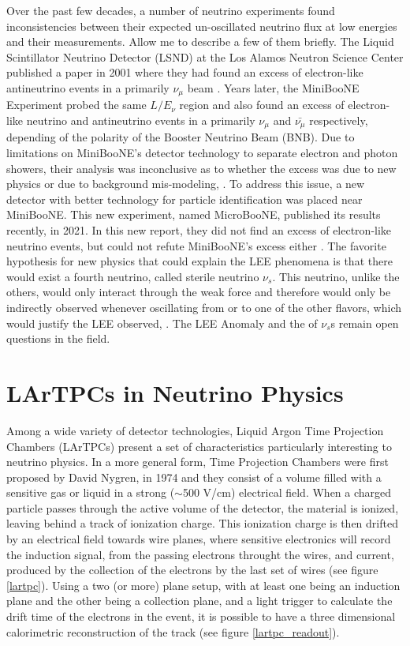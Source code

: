 Over the past few decades, a number of neutrino experiments found inconsistencies between their expected un-oscillated neutrino flux at low energies and their measurements. Allow me to describe a few of them briefly. The Liquid Scintillator Neutrino Detector (LSND) at the Los Alamos Neutron Science Center published a paper in 2001 where they had found an excess of electron-like antineutrino events in a primarily $\nu_{\mu}$ beam \cite{lsnd}. Years later, the MiniBooNE Experiment probed the same $L/E_{\nu}$ region and also found an excess of electron-like neutrino and antineutrino events in a primarily $\nu_{\mu}$ and $\bar{\nu_{\mu}}$ respectively, depending of the polarity of the Booster Neutrino Beam (BNB). Due to limitations on MiniBooNE's detector technology to separate electron and photon showers, their analysis was inconclusive as to whether the excess was due to new physics or due to background mis-modeling, \cite{miniboone}. To address this issue, a new detector with better technology for particle identification was placed near MiniBooNE. This new experiment, named MicroBooNE, published its results recently, in 2021. In this new report, they did not find an excess of electron-like neutrino events, but could not refute MiniBooNE's excess either \cite{microboone_lee}. The favorite hypothesis for new physics that could explain the LEE phenomena is that there would exist a fourth neutrino, called sterile neutrino $\nu_s$. This neutrino, unlike the others, would only interact through the weak force and therefore would only be indirectly observed whenever oscillating from or to one of the other flavors, which would justify the LEE observed, \cite{Lauren_thesis}. 
The LEE Anomaly and the of $\nu_s$s remain open questions in the field. 

\section{LArTPCs in Neutrino Physics}

Among a wide variety of detector technologies, Liquid Argon Time Projection Chambers (LArTPCs) present a set of characteristics particularly interesting to neutrino physics. 
In a more general form, Time Projection Chambers were first proposed by David Nygren, in 1974 \cite{Nygren} and they consist of a volume filled with a sensitive gas or liquid in a strong ($\sim$500 V/cm) electrical field. When a charged particle passes through the active volume of the detector, the material is ionized, leaving behind a track of ionization charge. This ionization charge is then drifted by an electrical field towards wire planes, where sensitive electronics will record the induction signal, from the passing electrons throught the wires, and current, produced by the collection of the electrons by the last set of wires (see figure \ref{lartpc}). Using a two (or more) plane setup, with at least one being an induction plane and the other being a collection plane, and a light trigger to calculate the drift time of the electrons in the event, it is possible to have a three dimensional calorimetric reconstruction of the track (see figure \ref{lartpc_readout}).

